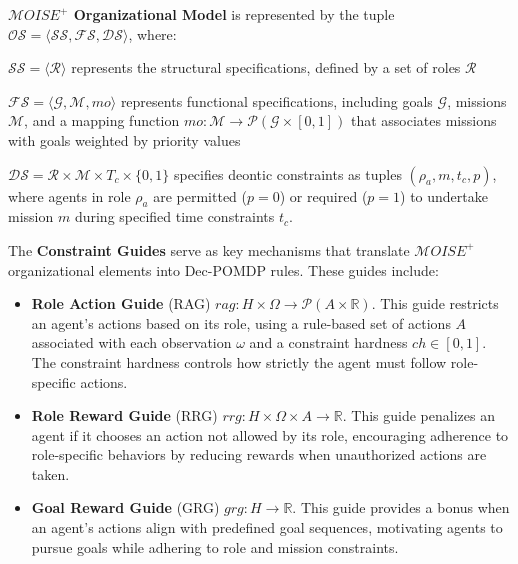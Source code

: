 \documentclass[conference]{IEEEtran}
\begin{document}
\textbf{$\mathcal{M}OISE^+$ Organizational Model} \quad is represented by the tuple $\mathcal{OS} = \langle \mathcal{SS}, \mathcal{FS}, \mathcal{DS} \rangle$, where:
\begin{itemize*}[label={},itemjoin={; }]
    \item $\mathcal{SS} = \langle \mathcal{R} \rangle$ represents the structural specifications, defined by a set of roles $\mathcal{R}$
    \item $\mathcal{FS} = \langle \mathcal{G}, \mathcal{M}, mo \rangle$ represents functional specifications, including goals $\mathcal{G}$, missions $\mathcal{M}$, and a mapping function $mo: \mathcal{M} \to \mathcal{P}(\mathcal{G} \times [0,1])$ that associates missions with goals weighted by priority values
    \item $\mathcal{DS} = \mathcal{R} \times \mathcal{M} \times T_c \times \{0,1\}$ specifies deontic constraints as tuples $(\rho_a, m, t_c, p)$, where agents in role $\rho_a$ are permitted ($p=0$) or required ($p=1$) to undertake mission $m$ during specified time constraints $t_c$.
\end{itemize*}

The \textbf{Constraint Guides} \quad serve as key mechanisms that translate $\mathcal{M}OISE^+$ organizational elements into Dec-POMDP rules. These guides include:

\begin{itemize}
    \item \textbf{Role Action Guide} (RAG) \quad $rag: H \times \Omega \rightarrow \mathcal{P}(A \times \mathbb{R})$. This guide restricts an agent's actions based on its role, using a rule-based set of actions $A$ associated with each observation $\omega$ and a constraint hardness $ch \in [0,1]$. The constraint hardness controls how strictly the agent must follow role-specific actions.
    \item \textbf{Role Reward Guide} (RRG) \quad $rrg: H \times \Omega \times A \to \mathbb{R}$. This guide penalizes an agent if it chooses an action not allowed by its role, encouraging adherence to role-specific behaviors by reducing rewards when unauthorized actions are taken.
    \item \textbf{Goal Reward Guide} (GRG) \quad $grg: H \rightarrow \mathbb{R}$. This guide provides a bonus when an agent's actions align with predefined goal sequences, motivating agents to pursue goals while adhering to role and mission constraints.
\end{itemize}
\end{document}
